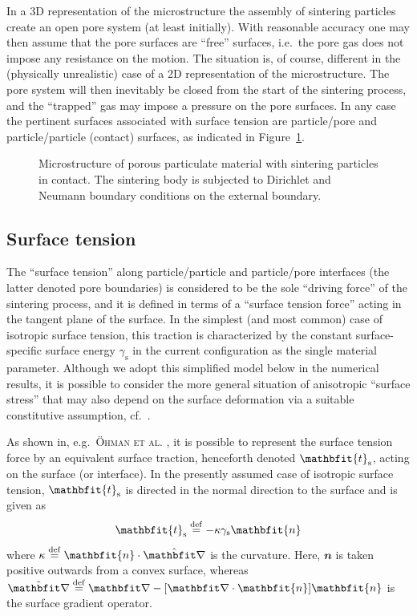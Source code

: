 \documentclass[12pt,review]{elsarticle}
\renewcommand{\ta}[1]{\mathbfit{#1}}
\newcommand{\figref}[1]{Figure~\ref{#1}}
\newcommand{\surf}{\mathrm{s}}
\begin{document}
In a 3D representation of the microstructure the assembly of sintering particles create an open pore system (at least initially).
With reasonable accuracy one may then assume that the pore surfaces are ``free'' surfaces, i.e.\ the pore gas does not impose any resistance on the motion.
The situation is, of course, different in the (physically unrealistic) case of a 2D representation of the microstructure.
The pore system will then inevitably be closed from the start of the sintering process, and the ``trapped'' gas may impose a pressure on the pore surfaces.
In any case the pertinent surfaces associated with surface tension are particle/pore and particle/particle (contact) surfaces, as indicated in \figref{fig:micro}.
\begin{figure}[th!]
    \centering
    
    \caption{Microstructure of porous particulate material with sintering particles in contact. The sintering body is subjected to Dirichlet and Neumann boundary conditions on the external boundary.}
    \label{fig:micro}
\end{figure}


\subsection{Surface tension}

The ``surface tension'' along particle/particle and particle/pore interfaces (the latter denoted pore boundaries) is considered to be the sole ``driving force'' of the sintering process, and it is defined in terms of a ``surface tension force'' acting in the tangent plane of the surface.
In the simplest (and most common) case of isotropic surface tension, this traction is characterized by the constant surface-specific surface energy $\gamma_\surf$ in the current configuration as the single material parameter.
Although we adopt this simplified model below in the numerical results, it is possible to consider the more general situation of anisotropic ``surface stress'' that may also depend on the surface deformation via a suitable constitutive assumption, cf.\ \cite{Steinmann2008:boundaryenergies}.

As shown in, e.g.\ \textsc{\"Ohman et al.} \cite{Ohman2012a}, it is possible to represent the surface tension force by an equivalent surface traction, henceforth denoted $\ta{t}_\fluct$, acting on the surface (or interface).
In the presently assumed case of isotropic surface tension, $\ta{t}_\fluct$ is directed in the normal direction to the surface and is given as
\begin{equation}
    \ta{t}_\surf\defeq -\kappa\gamma_\surf\ta{n}
\label{eq:surface_traction_strong}
\end{equation}
where $\kappa\defeq\ta{n}\cdot\hat{\diff}$ is the curvature.
Here, $\ta{n}$ is taken positive outwards from a convex surface, whereas $\hat\diff \defeq \diff - [\diff\cdot\ta{n}]\ta{n}$ is the surface gradient operator.
\end{document}
